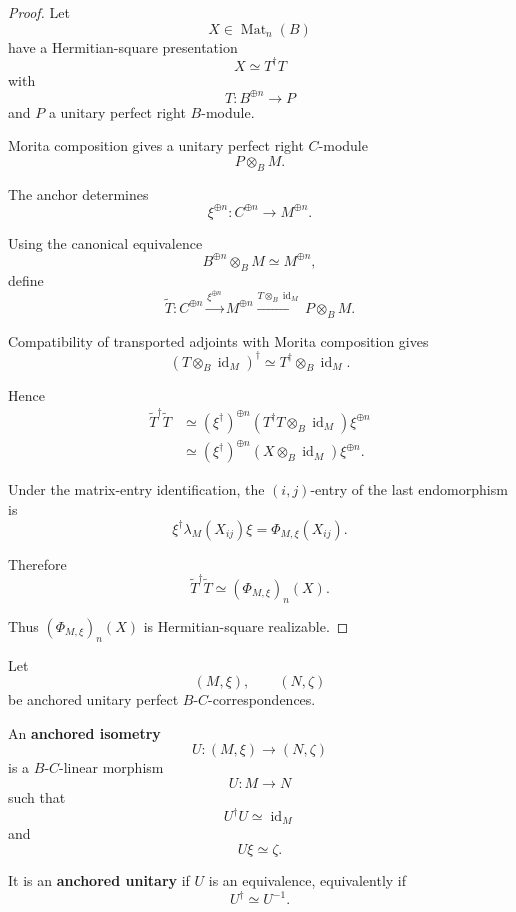 \begin{proof}
Let
\[
  X\in\operatorname{Mat}_n(B)
\]
have a Hermitian-square presentation
\[
  X\simeq T^\dagger T
\]
with
\[
  T:B^{\oplus n}\to P
\]
and \(P\) a unitary perfect right \(B\)-module.

Morita composition gives a unitary perfect right \(C\)-module
\[
  P\otimes_BM.
\]

The anchor determines
\[
  \xi^{\oplus n}:
  C^{\oplus n}
  \longrightarrow
  M^{\oplus n}.
\]

Using the canonical equivalence
\[
  B^{\oplus n}\otimes_BM
  \simeq
  M^{\oplus n},
\]
define
\[
  \widetilde T:
  C^{\oplus n}
  \xrightarrow{\xi^{\oplus n}}
  M^{\oplus n}
  \xrightarrow{T\otimes_B\operatorname{id}_M}
  P\otimes_BM.
\]

Compatibility of transported adjoints with Morita composition gives
\[
  (T\otimes_B\operatorname{id}_M)^\dagger
  \simeq
  T^\dagger\otimes_B\operatorname{id}_M.
\]

Hence
\[
\begin{aligned}
  \widetilde T^\dagger\widetilde T
  &\simeq
  (\xi^\dagger)^{\oplus n}
  (T^\dagger T\otimes_B\operatorname{id}_M)
  \xi^{\oplus n}
  \\
  &\simeq
  (\xi^\dagger)^{\oplus n}
  (X\otimes_B\operatorname{id}_M)
  \xi^{\oplus n}.
\end{aligned}
\]

Under the matrix-entry identification, the \((i,j)\)-entry of the last
endomorphism is
\[
  \xi^\dagger\lambda_M(X_{ij})\xi
  =
  \Phi_{M,\xi}(X_{ij}).
\]

Therefore
\[
  \widetilde T^\dagger\widetilde T
  \simeq
  (\Phi_{M,\xi})_n(X).
\]

Thus \((\Phi_{M,\xi})_n(X)\) is Hermitian-square realizable.
\end{proof}

\begin{definition}
\label{def:higher-anchored-isometry}
Let
\[
  (M,\xi),
  \qquad
  (N,\zeta)
\]
be anchored unitary perfect \(B\)-\(C\)-correspondences.

An \textbf{anchored isometry}
\[
  U:(M,\xi)\to(N,\zeta)
\]
is a \(B\)-\(C\)-linear morphism
\[
  U:M\to N
\]
such that
\[
  U^\dagger U
  \simeq
  \operatorname{id}_M
\]
and
\[
  U\xi
  \simeq
  \zeta.
\]

It is an \textbf{anchored unitary} if \(U\) is an equivalence, equivalently if
\[
  U^\dagger
  \simeq
  U^{-1}.
\]
\end{definition}

